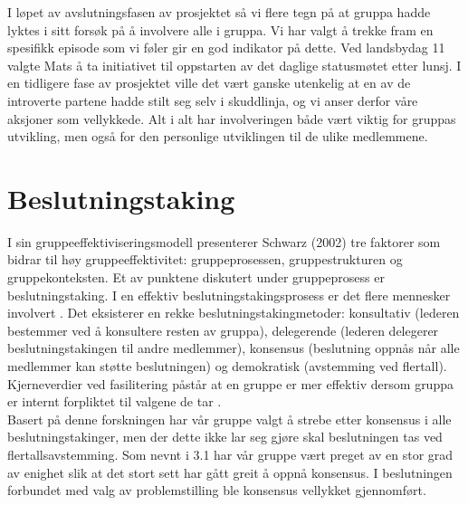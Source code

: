 I løpet av avslutningsfasen av prosjektet så vi flere tegn på at gruppa hadde lyktes i sitt forsøk på å involvere alle i gruppa. Vi har valgt å trekke fram en spesifikk episode som vi føler gir en god indikator på dette. Ved landsbydag 11 valgte Mats å ta initiativet til oppstarten av det daglige statusmøtet etter lunsj. I en tidligere fase av prosjektet ville det vært ganske utenkelig at en av de introverte partene hadde stilt seg selv i skuddlinja, og vi anser derfor våre aksjoner som vellykkede. Alt i alt har involveringen både vært viktig for gruppas utvikling, men også for den personlige utviklingen til de ulike medlemmene.\\


\section{Beslutningstaking}

I sin gruppeeffektiviseringsmodell presenterer Schwarz (2002)\cite{fasilitator} tre faktorer som bidrar til høy gruppeeffektivitet: gruppeprosessen, gruppestrukturen og gruppekonteksten. Et av punktene diskutert under gruppeprosess er beslutningstaking. I en effektiv beslutningstakingsprosess er det flere mennesker involvert . Det eksisterer en rekke beslutningstakingmetoder: konsultativ (lederen bestemmer  ved å konsultere resten av gruppa), delegerende (lederen delegerer beslutningstakingen til andre medlemmer), konsensus (beslutning oppnås når alle medlemmer kan støtte beslutningen) og demokratisk (avstemming ved flertall). Kjerneverdier ved fasilitering påstår at en gruppe er mer effektiv dersom gruppa er internt forpliktet til valgene de tar \cite{fasilitator}.\\

Basert på denne forskningen har vår gruppe valgt å strebe etter konsensus i alle beslutningstakinger, men der dette ikke lar seg gjøre skal beslutningen tas ved flertallsavstemming. Som nevnt i 3.1 har vår gruppe vært preget av en stor grad av enighet slik at det stort sett har gått greit å oppnå konsensus. I beslutningen forbundet med valg av problemstilling ble konsensus vellykket gjennomført.\\

